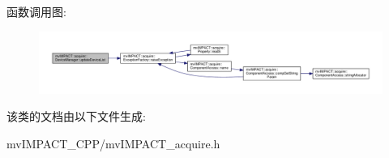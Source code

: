 函数调用图\+:
\nopagebreak
\begin{figure}[H]
\begin{center}
\leavevmode
\includegraphics[width=350pt]{classmv_i_m_p_a_c_t_1_1acquire_1_1_device_manager_a2078f9532f67854352c3be3e32364879_cgraph}
\end{center}
\end{figure}




该类的文档由以下文件生成\+:\begin{DoxyCompactItemize}
\item 
mv\+I\+M\+P\+A\+C\+T\+\_\+\+C\+P\+P/mv\+I\+M\+P\+A\+C\+T\+\_\+acquire.\+h\end{DoxyCompactItemize}
